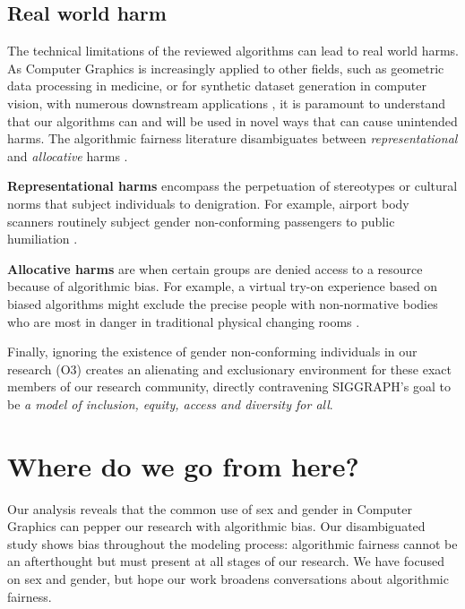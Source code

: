 \documentclass[nonacm,sigconf,review,balance=false]{acmart}
\begin{document}
\subsection{Real world harm}

The technical limitations of the reviewed algorithms can lead to real world harms. As Computer Graphics is increasingly applied to other fields, such as geometric data processing in medicine, or for synthetic dataset generation in computer vision, with numerous downstream applications \cite{cars, chen2021synthetic, dhs}, it is paramount to understand that our algorithms can and will be used in novel ways that can cause unintended harms. The algorithmic fairness literature disambiguates between {\em representational} and {\em allocative} harms \cite{barocas-hardt-narayanan}.

{\bf Representational harms} encompass the perpetuation of stereotypes or cultural norms that subject individuals to denigration. For example, airport body scanners routinely subject gender non-conforming passengers to public humiliation \cite{tsa}.

{\bf Allocative harms} are when certain groups are denied access to a resource because of algorithmic bias. For example, a virtual try-on experience based on biased algorithms might exclude the precise people with non-normative bodies who are most in danger in traditional physical changing rooms \cite{changingroom}.

Finally, ignoring the existence of gender non-conforming individuals in our research (O3) creates an alienating and exclusionary environment for these exact members of our research community, directly contravening SIGGRAPH's goal to be \emph{a model of inclusion, equity, access and diversity for all}.

\vspace{-0.1cm}
\section{Where do we go from here?}

Our analysis reveals that the common use of sex and gender in Computer Graphics can pepper our research with algorithmic bias. Our disambiguated study shows bias throughout the modeling process: algorithmic fairness cannot be an afterthought but must present at all stages of our research. We have focused on sex and gender, but hope our work broadens conversations about algorithmic fairness.%
\end{document}
